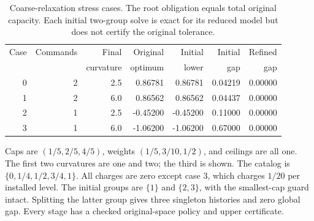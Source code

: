 \begin{table}[p]\centering
\caption{Coarse-relaxation stress cases. The root obligation equals total original capacity. Each initial two-group solve is exact for its reduced model but does not certify the original tolerance.}\label{tab:r47-stress}
\begin{tabular}{rrrrrrr}\toprule
Case & Commands & Final & Original & Initial & Initial & Refined \\
 & & curvature & optimum & lower & gap & gap \\\midrule
0 & 2 & 2.5 & 0.86781 & 0.86781 & 0.04219 & 0.00000 \\
1 & 2 & 6.0 & 0.86562 & 0.86562 & 0.04437 & 0.00000 \\
2 & 1 & 2.5 & -0.45200 & -0.45200 & 0.11000 & 0.00000 \\
3 & 1 & 6.0 & -1.06200 & -1.06200 & 0.67000 & 0.00000 \\
\bottomrule\end{tabular}
\par\smallskip\raggedright Caps are $(1/5,2/5,4/5)$, weights $(1/5,3/10,1/2)$, and ceilings are all one. The first two curvatures are one and two; the third is shown. The catalog is $\{0,1/4,1/2,3/4,1\}$. All charges are zero except case 3, which charges $1/20$ per installed level. The initial groups are $\{1\}$ and $\{2,3\}$, with the smallest-cap guard intact. Splitting the latter group gives three singleton histories and zero global gap. Every stage has a checked original-space policy and upper certificate.
\end{table}
